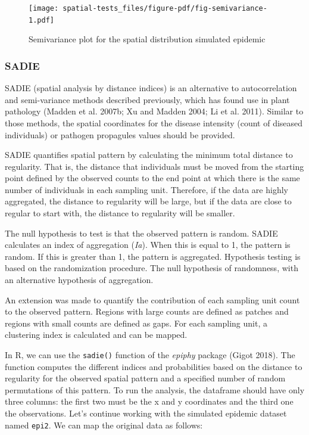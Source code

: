 \documentclass[
  letterpaper,
]{book}
\begin{document}
\begin{figure}[H]

\texttt{[image: spatial-tests\_files/figure-pdf/fig-semivariance-1.pdf]} \hfill{}

\caption{\label{fig-semivariance}Semivariance plot for the spatial
distribution simulated epidemic}

\end{figure}

\hypertarget{sadie}{%
\subsubsection{SADIE}\label{sadie}}

SADIE (spatial analysis by distance indices) is an alternative to
autocorrelation and semi-variance methods described previously, which
has found use in plant pathology (Madden et al. 2007b; Xu and Madden
2004; Li et al. 2011). Similar to those methods, the spatial coordinates
for the disease intensity (count of diseased individuals) or pathogen
propagules values should be provided.

SADIE quantifies spatial pattern by calculating the minimum total
distance to regularity. That is, the distance that individuals must be
moved from the starting point defined by the observed counts to the end
point at which there is the same number of individuals in each sampling
unit. Therefore, if the data are highly aggregated, the distance to
regularity will be large, but if the data are close to regular to start
with, the distance to regularity will be smaller.

The null hypothesis to test is that the observed pattern is random.
SADIE calculates an index of aggregation (\emph{Ia}). When this is equal
to 1, the pattern is random. If this is greater than 1, the pattern is
aggregated. Hypothesis testing is based on the randomization procedure.
The null hypothesis of randomness, with an alternative hypothesis of
aggregation.

An extension was made to quantify the contribution of each sampling unit
count to the observed pattern. Regions with large counts are defined as
patches and regions with small counts are defined as gaps. For each
sampling unit, a clustering index is calculated and can be mapped.

In R, we can use the \texttt{sadie()} function of the \emph{epiphy}
package (Gigot 2018). The function computes the different indices and
probabilities based on the distance to regularity for the observed
spatial pattern and a specified number of random permutations of this
pattern. To run the analysis, the dataframe should have only three
columns: the first two must be the x and y coordinates and the third one
the observations. Let's continue working with the simulated epidemic
dataset named \texttt{epi2}. We can map the original data as follows:
\end{document}
